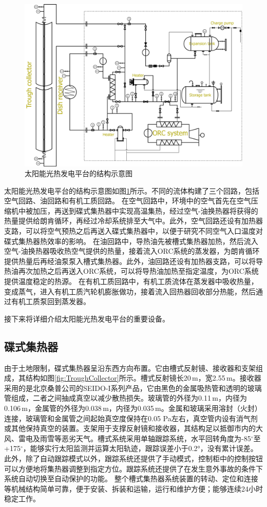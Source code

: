 \begin{figure}[!ht]
\centering
\includegraphics[width=1.0\textwidth]{fig/platform.jpg}
\caption{太阳能光热发电平台的结构示意图}\label{fig:platform}
\end{figure}
太阳能光热发电平台的结构示意图如图\ref{fig:platform}所示。不同的流体构建了三个回路，包括空气回路、油回路和有机工质回路。
在空气回路中，环境中的空气首先在空气压缩机中被加压，再送到碟式集热器中实现高温集热，经过空气-油换热器将获得的热量提供给朗肯循环，再经过冷却系统排至大气中。此外，空气回路还设有加热器支路，可以将空气预热之后再送入碟式集热器中，以便于研究不同空气入口温度对碟式集热器热效率的影响。
在油回路中，导热油先被槽式集热器加热，然后流入空气-油换热器吸收热空气提供的热量，接着流入ORC系统的蒸发器，为朗肯循环提供热量后再经油泵泵入槽式集热器。此外，油回路还设有加热器支路，可以将导热油再次加热之后再送入ORC系统，可以将导热油加热至指定温度，为ORC系统提供温度稳定的热源。
在有机工质回路中，有机工质流体在蒸发器中吸收热量，变成蒸气，进入有机工质汽轮机膨胀做功，接着流入回热器回收部分热能，然后通过有机工质泵回到蒸发器。

接下来将详细介绍太阳能光热发电平台的重要设备。

\subsection{碟式集热器}
由于土地限制，碟式集热器呈沿东西方向布置。它由槽式反射镜、接收器和支架组成，其结构如图\ref{fig:TroughCollector}所示。槽式反射镜长20$\,\mathrm{m}$，宽2.55$\,\mathrm{m}$。接收器采用的是北京桑普公司的SEIDO-I系列产品，它由黑色的金属吸热管和透明的玻璃管组成，二者之间抽成真空以减少散热损失。玻璃管的外径为0.11$\,\mathrm{m}$，内径为0.106$\,\mathrm{m}$，金属管的外径为0.038$\,\mathrm{m}$，内径为0.035$\,\mathrm{m}$。金属和玻璃采用溶封（火封）连接，玻璃管和金属管之间起始真空度保持在0.05 Pa左右，真空管内设有消气剂或其他保持真空的装置。支架用于支撑反射镜和接收器，其结构足以抵御市内的大风、雷电及雨雪等恶劣天气。槽式系统采用单轴跟踪系统，水平回转角度为-85$^\circ$至+175$^\circ$，能够实行太阳监测并运算太阳轨迹，跟踪误差小于0.2°，没有累计误差。此外，除了自动跟踪模式以外，跟踪系统还提供了手动模式，控制柜中的控制按钮可以方便地将集热器调整到指定方位。跟踪系统还提供了在发生意外事故的条件下系统自动切换至自动保护的功能。
整个槽式集热器系统装置的转动、定位和连接等机械结构简单可靠，便于安装、拆装和运输，运行和维护方便；能够连续24小时稳定工作。

